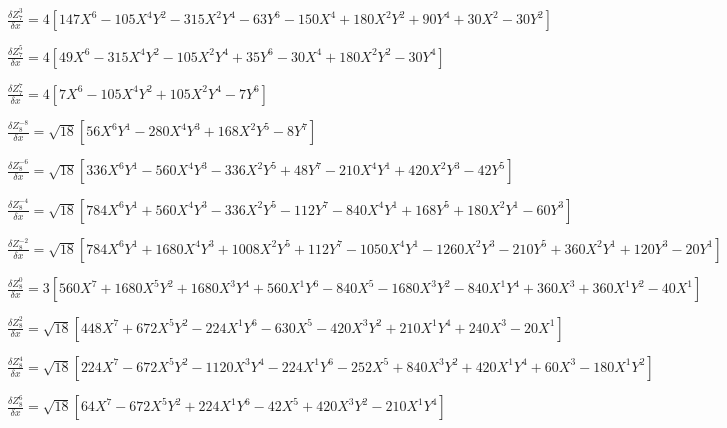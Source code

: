 \documentclass[10pt,landscape]{article}
\begin{document}
\vspace{1.2 mm}
\noindent $ \frac{\delta Z^{3}_{7}}{\delta x} = 4 [147X^{6} -105X^{4}Y^{2} -315X^{2}Y^{4} -63Y^{6} -150X^{4} +180X^{2}Y^{2} +90Y^{4} +30X^{2} -30Y^{2}] $

\vspace{1.2 mm}
\noindent $ \frac{\delta Z^{5}_{7}}{\delta x} = 4 [49X^{6} -315X^{4}Y^{2} -105X^{2}Y^{4} +35Y^{6} -30X^{4} +180X^{2}Y^{2} -30Y^{4}] $

\vspace{1.2 mm}
\noindent $ \frac{\delta Z^{7}_{7}}{\delta x} = 4 [7X^{6} -105X^{4}Y^{2} +105X^{2}Y^{4} -7Y^{6}] $

\vspace{1.2 mm}
\noindent $ \frac{\delta Z^{-8}_{8}}{\delta x} = \sqrt{18} [56X^{6}Y^{1} -280X^{4}Y^{3} +168X^{2}Y^{5} -8Y^{7}] $

\vspace{1.2 mm}
\noindent $ \frac{\delta Z^{-6}_{8}}{\delta x} = \sqrt{18} [336X^{6}Y^{1} -560X^{4}Y^{3} -336X^{2}Y^{5} +48Y^{7} -210X^{4}Y^{1} +420X^{2}Y^{3} -42Y^{5}] $

\vspace{1.2 mm}
\noindent $ \frac{\delta Z^{-4}_{8}}{\delta x} = \sqrt{18} [784X^{6}Y^{1} +560X^{4}Y^{3} -336X^{2}Y^{5} -112Y^{7} -840X^{4}Y^{1} +168Y^{5} +180X^{2}Y^{1} -60Y^{3}] $

\vspace{1.2 mm}
\noindent $ \frac{\delta Z^{-2}_{8}}{\delta x} = \sqrt{18} [784X^{6}Y^{1} +1680X^{4}Y^{3} +1008X^{2}Y^{5} +112Y^{7} -1050X^{4}Y^{1} -1260X^{2}Y^{3} -210Y^{5} +360X^{2}Y^{1} +120Y^{3} -20Y^{1}] $

\vspace{1.2 mm}
\noindent $ \frac{\delta Z^{0}_{8}}{\delta x} = 3 [560X^{7} +1680X^{5}Y^{2} +1680X^{3}Y^{4} +560X^{1}Y^{6} -840X^{5} -1680X^{3}Y^{2} -840X^{1}Y^{4} +360X^{3} +360X^{1}Y^{2} -40X^{1}] $

\vspace{1.2 mm}
\noindent $ \frac{\delta Z^{2}_{8}}{\delta x} = \sqrt{18} [448X^{7} +672X^{5}Y^{2} -224X^{1}Y^{6} -630X^{5} -420X^{3}Y^{2} +210X^{1}Y^{4} +240X^{3} -20X^{1}] $

\vspace{1.2 mm}
\noindent $ \frac{\delta Z^{4}_{8}}{\delta x} = \sqrt{18} [224X^{7} -672X^{5}Y^{2} -1120X^{3}Y^{4} -224X^{1}Y^{6} -252X^{5} +840X^{3}Y^{2} +420X^{1}Y^{4} +60X^{3} -180X^{1}Y^{2}] $

\vspace{1.2 mm}
\noindent $ \frac{\delta Z^{6}_{8}}{\delta x} = \sqrt{18} [64X^{7} -672X^{5}Y^{2} +224X^{1}Y^{6} -42X^{5} +420X^{3}Y^{2} -210X^{1}Y^{4}] $
\end{document}
